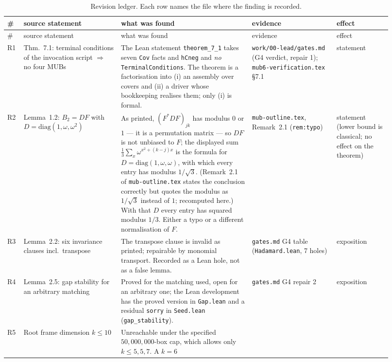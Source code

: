 \documentclass[10pt]{article}
\theoremstyle{definition}
\newcommand{\file}[1]{\texttt{\small #1}}
\begin{document}
\begin{longtable}{@{}L{0.035\linewidth}L{0.235\linewidth}L{0.315\linewidth}L{0.20\linewidth}L{0.135\linewidth}@{}}
\caption{Revision ledger. Each row names the file where the finding is recorded.}\label{tab:rev}\\
\toprule
\# & source statement & what was found & evidence & effect \\
\midrule
\endfirsthead
\toprule
\# & source statement & what was found & evidence & effect \\
\midrule
\endhead
R1 & Thm.~7.1: terminal conditions of the invocation script $\Rightarrow$ no four MUBs &
The Lean statement \file{theorem\_7\_1} takes seven \texttt{Cov} facts and \texttt{hCneg} and
\emph{no} \texttt{TerminalConditions}. The theorem is a factorisation into (i) an assembly over covers
and (ii) a driver whose bookkeeping realises them; only (i) is formal. &
\file{work/\allowbreak{}00-\allowbreak{}lead/\allowbreak{}gates.md} (G4 verdict, repair 1); \file{mub6-\allowbreak{}verification.tex} \S7.1 &
statement \\
R2 & Lemma~1.2: $B_2=DF$ with $D=\mathrm{diag}(1,\omega,\omega^2)$ &
As printed, $(F^*DF)_{jk}$ has modulus $0$ or $1$ --- it is a permutation matrix --- so $DF$ is not
unbiased to $F$; the displayed sum $\frac13\sum_x\omega^{x^2+(k-j)x}$ is the formula for
$D=\mathrm{diag}(1,\omega,\omega)$, with which every entry has modulus $1/\sqrt3$. (Remark~2.1 of
\file{mub-outline.tex} states the conclusion correctly but quotes the modulus as $1/\sqrt3$ instead of
$1$; recomputed here.) With
that $D$ every entry has squared modulus $1/3$. Either a typo or a different normalisation of $F$. &
\file{mub-\allowbreak{}outline.tex}, Remark~2.1 (\file{rem:typo}) &
statement (lower bound is classical; no effect on the theorem) \\
R3 & Lemma~2.2: six invariance clauses incl.\ transpose &
The transpose clause is invalid as printed; repairable by monomial transport. Recorded as a Lean hole,
not as a false lemma. & \file{gates.md} G4 table (\file{Hadamard.lean}, 7 holes) & exposition \\
R4 & Lemma~2.5: gap stability for an arbitrary matching &
Proved for the matching used, open for an arbitrary one; the Lean development has the proved version
in \file{Gap.lean} and a residual \texttt{sorry} in \file{Seed.lean} (\texttt{gap\_stability}). &
\file{gates.md} G4 repair 2 & exposition \\
R5 & Root frame dimension $k\le10$ &
Unreachable under the specified $50{,}000{,}000$-box cap, which allows only $k\le5,5,7$. A $k=6$

\end{longtable}
\end{document}
